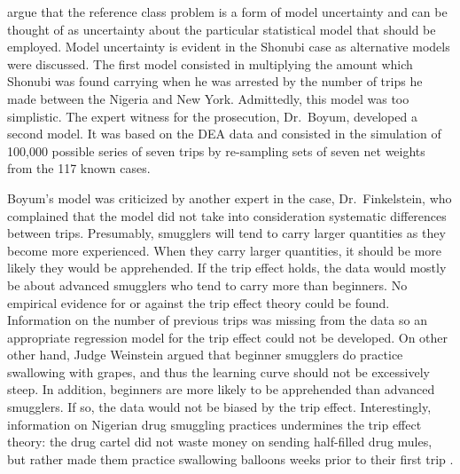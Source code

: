 \documentclass{article}
\begin{document}
	
 \citet{colyvan2007legal} argue that the
reference class problem is a form of model uncertainty and can be thought of as uncertainty about the particular statistical model that should be employed. %
Model uncertainty is evident in the Shonubi case as alternative models were discussed.
 The first model consisted in multiplying the amount which Shonubi was found carrying when he was arrested by the number of trips he made between the Nigeria and New York. Admittedly, this model was too simplistic. The expert witness for the prosecution, Dr.\ Boyum, developed a second model. It was based on the DEA data and consisted in the simulation of 100,000 possible series of seven trips by re-sampling sets of seven net weights from the 117 known cases. 
 
 Boyum's model was criticized by another expert in the case, Dr.\ Finkelstein, who complained that the model did not take into consideration  systematic differences between trips. Presumably, smugglers will tend to carry larger quantities as they become more experienced. When they carry larger quantities, it should be more likely they would be apprehended. If the trip effect holds, the data would mostly be about advanced smugglers who tend to carry more than beginners.  No empirical evidence for or against the trip effect theory could be found. Information on the number of previous trips was missing from the data so an appropriate regression model for the trip effect could not be developed. 
  On other other hand, Judge Weinstein argued that beginner smugglers do practice swallowing with grapes, and thus the learning curve should not be excessively steep. In addition, beginners are more likely to be apprehended than advanced smugglers. If so, the data would not be biased by the trip effect. Interestingly, information on Nigerian drug smuggling practices undermines the trip effect theory:  the drug cartel did not waste money on sending half-filled drug mules, but rather made them practice swallowing balloons weeks prior to their first trip \citep{Treaser1992,Wren1999pipeline}. %
\end{document}
